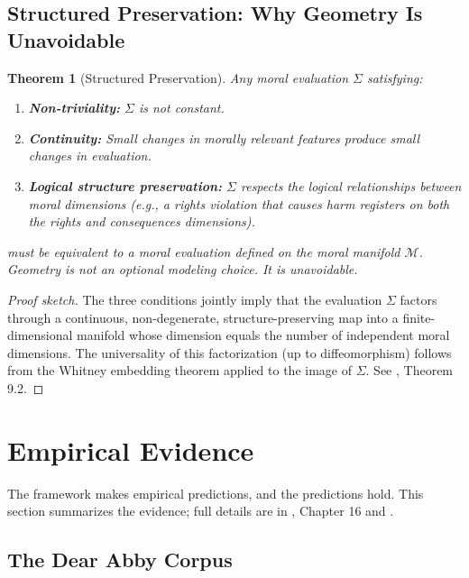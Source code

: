 \documentclass[12pt,letterpaper]{article}
\newtheorem{theorem}{Theorem}[section]
\theoremstyle{definition}
\theoremstyle{remark}
\newcommand{\M}{\mathcal{M}}
\begin{document}
\subsection{Structured Preservation: Why Geometry Is Unavoidable}

\begin{theorem}[Structured Preservation]
\label{thm:structured}
Any moral evaluation $\Sigma$ satisfying:
\begin{enumerate}[label=(\roman*)]
    \item \textbf{Non-triviality:} $\Sigma$ is not constant.
    \item \textbf{Continuity:} Small changes in morally relevant features produce small changes in evaluation.
    \item \textbf{Logical structure preservation:} $\Sigma$ respects the logical relationships between moral dimensions (e.g., a rights violation that causes harm registers on both the rights and consequences dimensions).
\end{enumerate}
must be equivalent to a moral evaluation defined on the moral manifold $\M$. Geometry is not an optional modeling choice. It is unavoidable.
\end{theorem}

\begin{proof}[Proof sketch]
The three conditions jointly imply that the evaluation $\Sigma$ factors through a continuous, non-degenerate, structure-preserving map into a finite-dimensional manifold whose dimension equals the number of independent moral dimensions. The universality of this factorization (up to diffeomorphism) follows from the Whitney embedding theorem applied to the image of $\Sigma$. See \cite{bond2026geometric}, Theorem 9.2.
\end{proof}


\section{Empirical Evidence}
\label{sec:evidence}

The framework makes empirical predictions, and the predictions hold. This section summarizes the evidence; full details are in \cite{bond2026geometric}, Chapter 16 and \cite{bond2026dearabby}.

\subsection{The Dear Abby Corpus}
\end{document}
